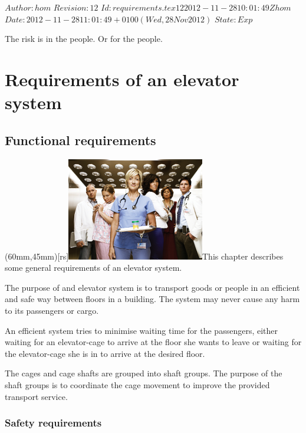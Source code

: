 \providecommand\sourceroot{../40_sources/sevenloio/sevenlowarrior/}

\renewcommand\TheFile{requirements.tex}
\SVN $Author: hom $
\SVN $Revision: 12 $
\SVN $Id: requirements.tex 12 2012-11-28 10:01:49Z hom $
\SVN $Date: 2012-11-28 11:01:49 +0100 (Wed, 28 Nov 2012) $
\SVN $State: Exp $
\begin{savequote}[8cm]
  \sffamily
  The risk is in the people. Or for the people.
\end{savequote}

\chapter{Requirements of an elevator system}
\section{Functional requirements}
\parpic(60mm,45mm)[rs]{\includegraphics[width=60mm]{figures/nurse_jackie_gal2_pr01_elevator.jpg}}This chapter describes some general requirements of an elevator
system.
 
The purpose of and elevator system is to transport goods or people in
an efficient and safe way between floors in a building. The system
may never cause any harm to its passengers or cargo.

An efficient system tries to minimise waiting time for the passengers,
either waiting for an elevator-cage to arrive at the floor she wants
to leave or waiting for the elevator-cage she is in to arrive at the 
desired floor.

The cages and cage shafts are grouped into shaft groups. The purpose of
the shaft groups is to coordinate the cage movement to improve the
provided transport service.

\subsection{Safety requirements}

